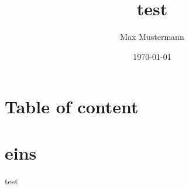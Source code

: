 \documentclass{beamer}
\title{test}
\author{Max Mustermann}
\date{\today}
\institute{Fachhochschule Trier}
\begin{document}
\maketitle

\section*{Table of content}
\begin{frame}
	\tableofcontents
\end{frame}

\section{eins}
\begin{frame}
	test
\end{frame}
\end{document}
